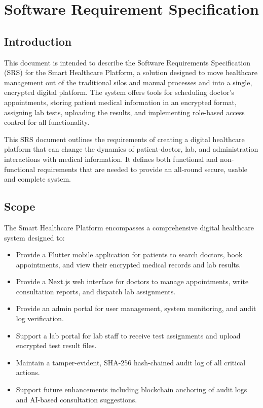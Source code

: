 \documentclass[a4paper,12pt]{report}
\begin{document}
\chapter{Software Requirement Specification}

\section{Introduction}

This document is intended to describe the Software Requirements Specification (SRS) for the Smart Healthcare Platform, a solution designed to move healthcare management out of the traditional silos and manual processes and into a single, encrypted digital platform. The system offers tools for scheduling doctor's appointments, storing patient medical information in an encrypted format, assigning lab tests, uploading the results, and implementing role-based access control for all functionality.

This SRS document outlines the requirements of creating a digital healthcare platform that can change the dynamics of patient-doctor, lab, and administration interactions with medical information. It defines both functional and non-functional requirements that are needed to provide an all-round secure, usable and complete system.

\section{Scope}

The Smart Healthcare Platform encompasses a comprehensive digital healthcare system designed to:

\begin{itemize}
    \item Provide a Flutter mobile application for patients to search doctors, book appointments, and view their encrypted medical records and lab results.
    \item Provide a Next.js web interface for doctors to manage appointments, write consultation reports, and dispatch lab assignments.
    \item Provide an admin portal for user management, system monitoring, and audit log verification.
    \item Support a lab portal for lab staff to receive test assignments and upload encrypted test result files.
    \item Maintain a tamper-evident, SHA-256 hash-chained audit log of all critical actions.
    \item Support future enhancements including blockchain anchoring of audit logs and AI-based consultation suggestions.
\end{itemize}
\end{document}
